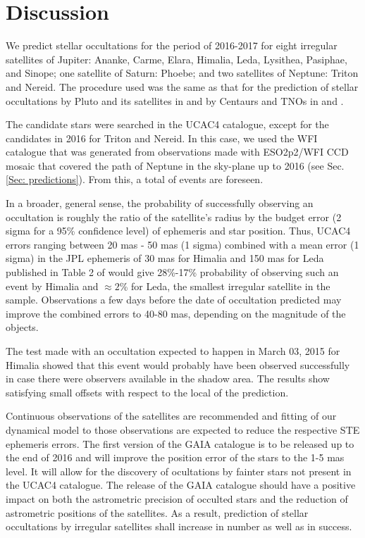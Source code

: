 \documentclass[useAMS,usenatbib]{mn2e}
\begin{document}
\section{Discussion} \label{Sec: discussion}

We predict stellar occultations for the period of 2016-2017 for eight irregular satellites of Jupiter: Ananke, Carme, Elara, Himalia, Leda, Lysithea, Pasiphae, and Sinope; one satellite of Saturn: Phoebe; and two satellites of Neptune: Triton and Nereid. The procedure used was the same as that for the prediction of stellar occultations by Pluto and its satellites in \cite{Assafin2010} and by Centaurs and TNOs in \cite{Assafin2012} and \cite{Camargo2014}.

The candidate stars were searched in the UCAC4 catalogue, except for the candidates in 2016 for Triton and Nereid. In this case, we used the WFI catalogue that was generated from observations made with ESO2p2/WFI CCD mosaic that covered the path of Neptune in the sky-plane up to 2016 (see Sec. \ref{Sec: predictions}). From this, a total of \noccs events are foreseen. 

In a broader, general sense, the probability of successfully observing an occultation is roughly the ratio of the satellite's radius by the budget error (2 sigma for a 95\% confidence level) of ephemeris and star position. Thus, UCAC4 errors ranging between 20 mas - 50 mas (1 sigma) combined with a mean error (1 sigma) in the JPL ephemeris of 30 mas for Himalia and 150 mas for Leda published in Table 2 of \cite{Jacobson2012} would give 28\%-17\% probability of observing such an event by Himalia and $\approx2$\% for Leda, the smallest irregular satellite in the sample. Observations a few days before the date of occultation predicted may improve the combined errors to 40-80 mas, depending on the magnitude of the objects.

The test made with an occultation expected to happen in March 03, 2015 for Himalia showed that this event would probably have been observed successfully in case there were observers available in the shadow area. The results show satisfying small offsets with respect to the local of the prediction.

Continuous observations of the satellites are recommended and fitting of our dynamical model to those observations are expected to reduce the respective STE ephemeris errors. The first version of the GAIA catalogue is to be released up to the end of 2016 and will improve the position error of the stars to the 1-5 mas level. It will allow for the discovery of ocultations by fainter stars not present in the UCAC4 catalogue.
The release of the GAIA catalogue should have a positive impact on both the astrometric precision of occulted stars and the reduction of astrometric positions of the satellites. As a result, prediction of stellar occultations by irregular satellites shall increase in number as well as in success.
\end{document}
